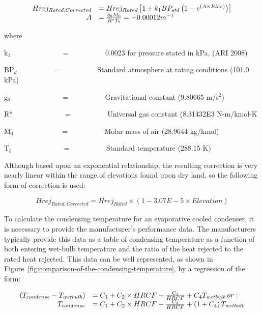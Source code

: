 \begin{equation}
  \begin{array}{rl}
    Hrej_{Rated,Corrected} &= Hrej_{Rated} \RB{ 1 + k_1 B P_{std} \PB{1 - e^{\PB{A \times Elev}}}} \\
    A &= \frac{g_0 M_0}{R^* T_b} = - 0.00012m^{-1}
  \end{array}
\end{equation}

where

k\(_{1}\)~~~~~~~~~~~~~~ = ~~~~~~~~~ 0.0023 for pressure stated in kPa, (ARI 2008)

BP\(_{d}\)~~~~~~~~~~ = ~~~~~~~~~ Standard atmosphere at rating conditions (101.0 kPa)

g\(_{0}\)~~~~~~~~~~~~~~ = ~~~~~~~~~ Gravitational constant (9.80665 m/s\(^{2}\))

R*~~~~~~~~~~~~~~ = ~~~~~~~~~ Universal gas constant (8.31432E3 N-m/kmol-K

M\(_{0}\)~~~~~~~~~~~~~ = ~~~~~~~~~ Molar mass of air (28.9644 kg/kmol)

T\(_{b}\)~~~~~~~~~~~~~~ = ~~~~~~~~~ Standard temperature (288.15 K)

Although based upon an exponential relationship, the resulting correction is very nearly linear within the range of elevations found upon dry land, so the following form of correction is used:

\begin{equation}
Hre{j_{Rated,Corrected}} = Hre{j_{Rated}} \times (1 - 3.07E - 5 \times Elevation)
\end{equation}

To calculate the condensing temperature for an evaporative cooled condenser, it is necessary to provide the manufacturer's performance data. The manufacturers typically provide this data as a table of condensing temperature as a function of both entering wet-bulb temperature and the ratio of the heat rejected to the rated heat rejected. This data can be well represented, as shown in Figure~\ref{fig:comparison-of-the-condensing-temperature}, by a regression of the form:

\begin{equation}
  \begin{array}{rl}
    \PB{T_{condense} - T_{wetbulb}} &= {C_1} + {C_2} \times HRCF + \frac{C_3}{HRCF} + {C_4}{T_{wetbulb}}\, or: \\
    T_{condense} &= {C_1} + {C_2} \times HRCF + \frac{C_3}{HRCF} + \PB{1 + C_4}T_{wetbulb}
  \end{array}
\end{equation}

